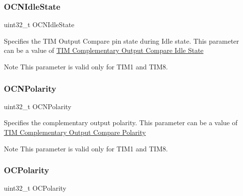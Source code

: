 \subsubsection{\texorpdfstring{O\+C\+N\+Idle\+State}{OCNIdleState}}
{\footnotesize\ttfamily uint32\+\_\+t O\+C\+N\+Idle\+State}

Specifies the T\+IM Output Compare pin state during Idle state. This parameter can be a value of \hyperlink{group___t_i_m___output___compare___n___idle___state}{T\+IM Complementary Output Compare Idle State} \begin{DoxyNote}{Note}
This parameter is valid only for T\+I\+M1 and T\+I\+M8. 
\end{DoxyNote}
\mbox{\label{struct_t_i_m___one_pulse___init_type_def_a978da9dd7cda80eb5fe8d04828b9bbcc}} 
\subsubsection{\texorpdfstring{O\+C\+N\+Polarity}{OCNPolarity}}
{\footnotesize\ttfamily uint32\+\_\+t O\+C\+N\+Polarity}

Specifies the complementary output polarity. This parameter can be a value of \hyperlink{group___t_i_m___output___compare___n___polarity}{T\+IM Complementary Output Compare Polarity} \begin{DoxyNote}{Note}
This parameter is valid only for T\+I\+M1 and T\+I\+M8. 
\end{DoxyNote}
\mbox{\label{struct_t_i_m___one_pulse___init_type_def_a781c7dae9dec8b6c974b1bdf591b77e7}} 
\subsubsection{\texorpdfstring{O\+C\+Polarity}{OCPolarity}}
{\footnotesize\ttfamily uint32\+\_\+t O\+C\+Polarity}

